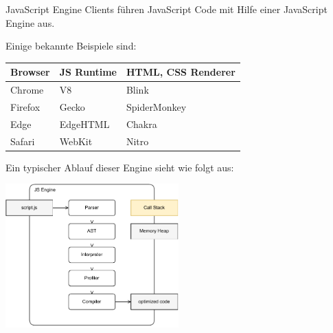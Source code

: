 \begin{defi}{JavaScript Engine}
    Clients führen JavaScript Code mit Hilfe einer JavaScript Engine aus.

    Einige bekannte Beispiele sind:

    \begin{center}
        \begin{tabular}{|l|l|l|}
            \hline
            Browser & JS Runtime & HTML, CSS Renderer \\\hline\hline
            Chrome  & V8         & Blink              \\\hline
            Firefox & Gecko      & SpiderMonkey       \\\hline
            Edge    & EdgeHTML   & Chakra             \\\hline
            Safari  & WebKit     & Nitro              \\\hline
        \end{tabular}
    \end{center}

    Ein typischer Ablauf dieser Engine sieht wie folgt aus:

    \begin{center}
        \includegraphics[width=0.5\textwidth]{includes/figures/defi_js_engine.pdf}
    \end{center}
\end{defi}

